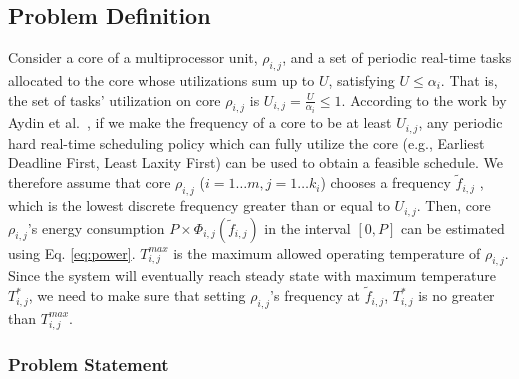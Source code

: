 \documentclass[conference]{IEEEtran}
\newtheorem{proposition}{Proposition}
\begin{document}
\subsection{Problem Definition}
\label{sec:pd}

Consider a core of a multiprocessor unit, $\rho_{i,j}$, and a set of periodic real-time tasks allocated to the core whose utilizations sum up to $U$, satisfying $U \leq \alpha_i$. That is, the set of tasks' utilization on core $\rho_{i,j}$ is $U_{i,j} = \frac{U}{\alpha_i} \leq 1$.    
%
%
According to the work by Aydin et al.~\cite{Aydin01}, if we make the frequency of a core to be at least $U_{i,j}$, any periodic hard real-time scheduling policy which can fully utilize the core (e.g., Earliest Deadline First, Least Laxity First) can be used to obtain a feasible schedule.
We therefore assume that core $\rho_{i,j}$ ($i=1 \ldots m, j=1 \ldots k_i$) chooses a frequency $\tilde{f}_{i,j}$ , which is the lowest discrete frequency  greater than or equal to $U_{i,j}$. Then, core $\rho_{i,j}$'s energy consumption  $P \times \Phi_{i,j}(\tilde{f}_{i,j})$ in the interval $[0,P]$ can be estimated using Eq. \ref{eq:power}. 
$T^{max}_{i,j}$ is the maximum allowed operating temperature of $\rho_{i,j}$.
Since the system will eventually reach  steady state with maximum temperature $T^*_{i,j}$, we need to make sure that setting $\rho_{i,j}$'s frequency at $\tilde{f}_{i,j}$, $T^*_{i,j}$ is no greater than $T^{max}_{i,j}$. 

\subsubsection{Problem Statement} 
\end{document}
